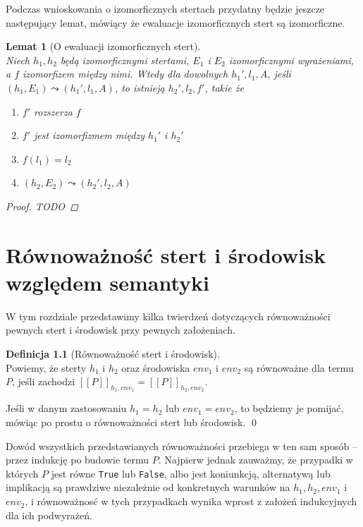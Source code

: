 \documentclass[]{pracamgr}
\renewcommand \| {\hspace{0.75em} | \hspace{0.75em} }
\renewcommand \[ {[\![}
\renewcommand \] {]\!]}
\newcommand \eval [1] {\overset{#1}{\leadsto}}
\newtheorem{lemma}{Lemat}
\theoremstyle{definition}
\newtheorem{definition}{Definicja}[section]
\begin{document}
Podczas wnioskowania o izomorficznych stertach przydatny będzie jeszcze następujący
lemat, mówiący że ewaluacje izomorficznych stert są izomorficzne.

\begin{lemma}[O ewaluacji izomorficznych stert] {\ } \\
\label{lem:iso_eval}
Niech $h_1, h_2$ będą izomorficznymi stertami, $E_1$ i $E_2$ izomorficznymi wyrażeniami,
a $f$ izomorfizem między nimi.
Wtedy dla dowolnych $h_1', l_1, A$, jeśli $(h_1, E_1) \eval{} (h_1', l_1, A)$, to
istnieją $h_2', l_2, f'$, takie że
\begin{enumerate}
 \item $f'$ rozszerza $f$
 \item $f'$ jest izomorfizmem między $h_1'$ i $h_2'$
 \item $f(l_1) = l_2$
 \item $(h_2, E_2) \eval{} (h_2', l_2, A)$
\end{enumerate}
\begin{proof}
TODO
\end{proof}
\end{lemma}

\chapter{Równoważność stert i środowisk względem semantyki}
W tym rozdziale przedstawimy kilka twierdzeń dotyczących równoważności pewnych stert i środowisk
przy pewnych założeniach.

\begin{definition}[Równoważność stert i środowisk] {\ } \\
Powiemy, że sterty $h_1$ i $h_2$ oraz środowiska $env_1$ i $env_2$ są równoważne dla termu $P$, jeśli
zachodzi $\[ P \]_{h_1, env_1} = \[ P \]_{h_2, env_2}$.

Jeśli w danym zastosowaniu $h_1 = h_2$ lub $env_1 = env_2$, to będziemy je pomijać,
mówiąc po prostu o równoważności stert lub środowisk.
\qed
\end{definition}

Dowód wszystkich przedstawianych równoważności przebiega w ten sam sposób -- przez indukcję
po budowie termu $P$. Najpierw jednak zauważmy, że przypadki w których $P$ jest równe 
\texttt{True} lub \texttt{False}, albo jest koniunkcją, alternatywą lub implikacją
są prawdziwe niezależnie od konkretnych warunków na $h_1, h_2, env_1$ i $env_2$, i
równoważnosć w tych przypadkach wynika wprost
z założeń indukcyjnych dla ich podwyrażeń.
\end{document}
